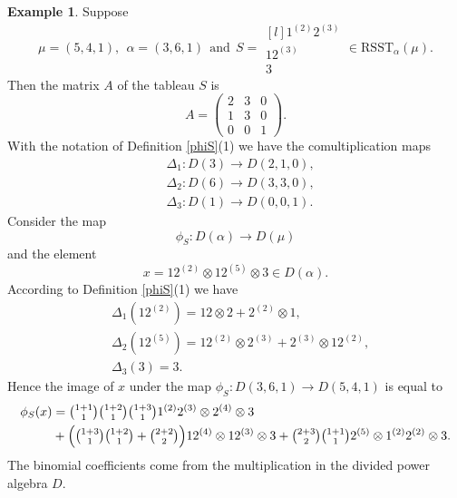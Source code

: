 \documentclass[11pt]{amsart}
\theoremstyle{definition}
\newtheorem{ex}[thm]{Example}
\numberwithin{equation}{section}
\begin{document}
\begin{ex}\label{exphiS}
Suppose \[\mu = (5,4,1), \ \ \alpha = (3,6,1) \ \ \mathrm{and} \ \ S =\begin{matrix*}[l]
	1^{(2)} 2^{(3)} \\
	12^{(3)} \\
	3 \end{matrix*} \in \mathrm{RSST}_\alpha({\mu}).\] Then the matrix $A$ of the tableau $S$ is \[A= \begin{pmatrix} 2&3&0\\
	1&3&0\\0&0&1\end{pmatrix}.\] With the notation of Definition \ref{phiS}(1)  we have the comultiplication maps 
	\begin{align*}
		&\Delta_1 : D(3) \to D(2,1,0), \\
		&\Delta_2 : D(6) \to D(3,3,0), \\
		&\Delta_3 : D(1) \to D(0,0,1).\end{align*}
	Consider the map \[\phi_S: D(\alpha) \to D(\mu) \] and the element \[x=12^{(2)}\otimes 12^{(5)} \otimes 3 \in D(\alpha).\]
According to Definition \ref{phiS}(1)  we have \begin{align*}
	&\Delta_1(12^{(2)})=12 \otimes 2 + 2^{(2)}\otimes 1, \\
	&\Delta_2(12^{(5)})=12^{(2)} \otimes 2^{(3)}+2^{(3)} \otimes 12^{(2)}, \\
	&\Delta_3(3)=3.\end{align*} Hence the image of $x$ under the map $\phi_S:D(3,6,1) \to D(5,4,1)$ is equal to 
\begin{align*}
	\phi_S(x)&= \tbinom{1+1}{1} \tbinom{1+2}{1}\tbinom{1+3}{1} 1^{(2)}2^{(3)} \otimes  2^{(4)} \otimes 3 \\ &+ \Big( \tbinom{1+3}{1}\tbinom{1+2}{1}+\tbinom{2+2}{2} \Big) 12^{(4)}\otimes 12^{(3)} \otimes 3 +\tbinom{2+3}{2}\tbinom{1+1}{1} 2^{(5)}\otimes 1^{(2)}2^{(2)} \otimes 3.
\end{align*} 
The binomial coefficients come from the multiplication in the divided power algebra $D$.
\end{ex}
\end{document}

